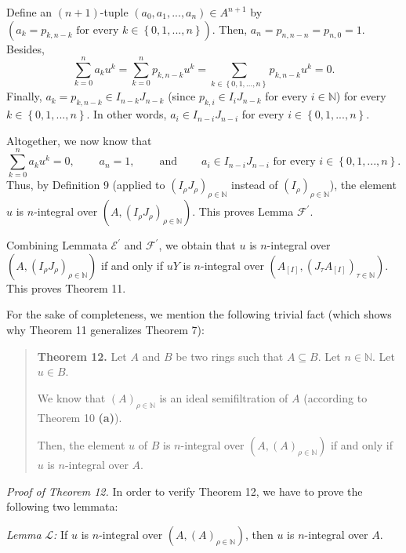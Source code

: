 \documentclass[12pt,final,notitlepage,onecolumn]{article}%
\begin{document}
Define an $\left(  n+1\right)  $-tuple $\left(  a_{0},a_{1},...,a_{n}\right)
\in A^{n+1}$ by $\left(  a_{k}=p_{k,n-k}\text{ for every }k\in\left\{
0,1,...,n\right\}  \right)  .$ Then, $a_{n}=p_{n,n-n}=p_{n,0}=1$. Besides,%
\[
\sum\limits_{k=0}^{n}a_{k}u^{k}=\sum\limits_{k=0}^{n}p_{k,n-k}u^{k}%
=\sum\limits_{k\in\left\{  0,1,...,n\right\}  }p_{k,n-k}u^{k}=0.
\]
Finally, $a_{k}=p_{k,n-k}\in I_{n-k}J_{n-k}$ (since $p_{k,i}\in I_{i}J_{n-k}$
for every $i\in\mathbb{N}$) for every $k\in\left\{  0,1,...,n\right\}  $. In
other words, $a_{i}\in I_{n-i}J_{n-i}$ for every $i\in\left\{
0,1,...,n\right\}  $.

Altogether, we now know that%
\[
\sum\limits_{k=0}^{n}a_{k}u^{k}=0,\ \ \ \ \ \ \ \ \ \ a_{n}%
=1,\ \ \ \ \ \ \ \ \ \ \text{and}\ \ \ \ \ \ \ \ \ \ a_{i}\in I_{n-i}%
J_{n-i}\text{ for every }i\in\left\{  0,1,...,n\right\}  .
\]
Thus, by Definition 9 (applied to $\left(  I_{\rho}J_{\rho}\right)  _{\rho
\in\mathbb{N}}$ instead of $\left(  I_{\rho}\right)  _{\rho\in\mathbb{N}}$),
the element $u$ is $n$-integral over $\left(  A,\left(  I_{\rho}J_{\rho
}\right)  _{\rho\in\mathbb{N}}\right)  $. This proves Lemma $\mathcal{F}%
^{\prime}$.

Combining Lemmata $\mathcal{E}^{\prime}$ and $\mathcal{F}^{\prime}$, we obtain
that $u$ is $n$-integral over $\left(  A,\left(  I_{\rho}J_{\rho}\right)
_{\rho\in\mathbb{N}}\right)  $ if and only if $uY$ is $n$-integral over
$\left(  A_{\left[  I\right]  },\left(  J_{\tau}A_{\left[  I\right]  }\right)
_{\tau\in\mathbb{N}}\right)  $. This proves Theorem 11.

For the sake of completeness, we mention the following trivial fact (which
shows why Theorem 11 generalizes Theorem 7):

\begin{quote}
\textbf{Theorem 12.} Let $A$ and $B$ be two rings such that $A\subseteq B$.
Let $n\in\mathbb{N}$. Let $u\in B$.

We know that $\left(  A\right)  _{\rho\in\mathbb{N}}$ is an ideal
semifiltration of $A$ (according to Theorem 10 \textbf{(a)}).

Then, the element $u$ of $B$ is $n$-integral over $\left(  A,\left(  A\right)
_{\rho\in\mathbb{N}}\right)  $ if and only if $u$ is $n$-integral over $A$.
\end{quote}

\textit{Proof of Theorem 12.} In order to verify Theorem 12, we have to prove
the following two lemmata:

\textit{Lemma }$\mathcal{L}$\textit{:} If $u$ is $n$-integral over $\left(
A,\left(  A\right)  _{\rho\in\mathbb{N}}\right)  $, then $u$ is $n$-integral
over $A$.
\end{document}
